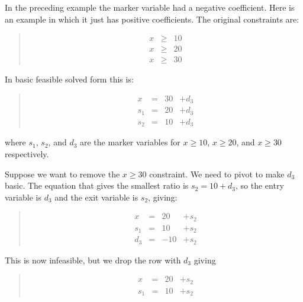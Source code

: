 \documentclass{article}
\begin{document}
In the preceding example the marker variable had a negative coefficient.
Here is an example in which it just has positive coefficients.  
The original constraints are:

\begin{quote}\vspace*{-1ex}
$$
\begin{array}{rlrrr} 
x & \geq & 10   \\
x & \geq & 20   \\
x & \geq & 30 
\end{array}
$$
\end{quote}\vspace{-0.9ex}

In basic feasible solved form this is:

\begin{quote}\vspace*{-1ex}
$$
\begin{array}{rlrrr} 
x & = & 30 & + d_3   \\ \hline
s_1 & = & 20 & + d_3 \\
s_2 & = & 10 & + d_3 
\end{array}
$$
\end{quote}\vspace{-0.9ex}

where $s_1$, $s_2$, and $d_3$ are the marker variables for 
$x \geq 10$, $x \geq 20$, and $x \geq 30$ respectively.

Suppose we want to remove the $x \geq 30$ constraint.  We need to pivot to
make $d_3$ basic.  The equation that gives the smallest ratio is 
$s_2  = 10  + d_3$, so the entry variable is $d_3$ and the exit variable is
$s_2$, giving:

\begin{quote}\vspace*{-1ex}
$$
\begin{array}{rlrrr} 
x & = & 20 & + s_2   \\ \hline
s_1 & = & 10 & + s_2 \\
d_3 & = & -10 & + s_2 
\end{array}
$$
\end{quote}\vspace{-0.9ex}

This is now infeasible, but we drop the row with $d_3$ giving 

\begin{quote}\vspace*{-1ex}
$$
\begin{array}{rlrrr} 
x & = & 20 & + s_2   \\ \hline
s_1 & = & 10 & + s_2 
\end{array}
$$
\end{quote}\vspace{-0.9ex}
\end{document}
